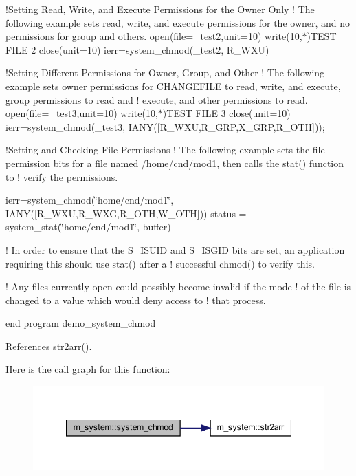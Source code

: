 !\+Setting Read, Write, and Execute Permissions for the Owner Only ! The following example sets read, write, and execute permissions for the owner, and no permissions for group and others. open(file=\textquotesingle{}\+\_\+test2\textquotesingle{},unit=10) write(10,$\ast$)\textquotesingle{}T\+E\+ST F\+I\+LE 2\textquotesingle{} close(unit=10) ierr=system\+\_\+chmod(\textquotesingle{}\+\_\+test2\textquotesingle{}, R\+\_\+\+W\+XU)

!\+Setting Different Permissions for Owner, Group, and Other ! The following example sets owner permissions for C\+H\+A\+N\+G\+E\+F\+I\+LE to read, write, and execute, group permissions to read and ! execute, and other permissions to read. open(file=\textquotesingle{}\+\_\+test3\textquotesingle{},unit=10) write(10,$\ast$)\textquotesingle{}T\+E\+ST F\+I\+LE 3\textquotesingle{} close(unit=10) ierr=system\+\_\+chmod(\textquotesingle{}\+\_\+test3\textquotesingle{}, I\+A\+N\+Y(\mbox{[}\+R\+\_\+\+W\+X\+U,\+R\+\_\+\+G\+R\+P,\+X\+\_\+\+G\+R\+P,\+R\+\_\+\+O\+T\+H\mbox{]}));

!\+Setting and Checking File Permissions ! The following example sets the file permission bits for a file named /home/cnd/mod1, then calls the stat() function to ! verify the permissions.

ierr=system\+\_\+chmod(\char`\"{}home/cnd/mod1\char`\"{}, I\+A\+N\+Y(\mbox{[}\+R\+\_\+\+W\+X\+U,\+R\+\_\+\+W\+X\+G,\+R\+\_\+\+O\+T\+H,\+W\+\_\+\+O\+T\+H\mbox{]})) status = system\+\_\+stat(\char`\"{}home/cnd/mod1\char`\"{}, buffer)

! In order to ensure that the S\+\_\+\+I\+S\+U\+ID and S\+\_\+\+I\+S\+G\+ID bits are set, an application requiring this should use stat() after a ! successful chmod() to verify this.

! Any files currently open could possibly become invalid if the mode ! of the file is changed to a value which would deny access to ! that process.

end program demo\+\_\+system\+\_\+chmod 

References str2arr().

Here is the call graph for this function\+:
\nopagebreak
\begin{figure}[H]
\begin{center}
\leavevmode
\includegraphics[width=347pt]{namespacem__system_ace9ce0c8a9c8341a76b8903cd2390ce3_cgraph}
\end{center}
\end{figure}
\mbox{\label{namespacem__system_a3353c1cff032fcfe2985a69f10038ddd}} 
